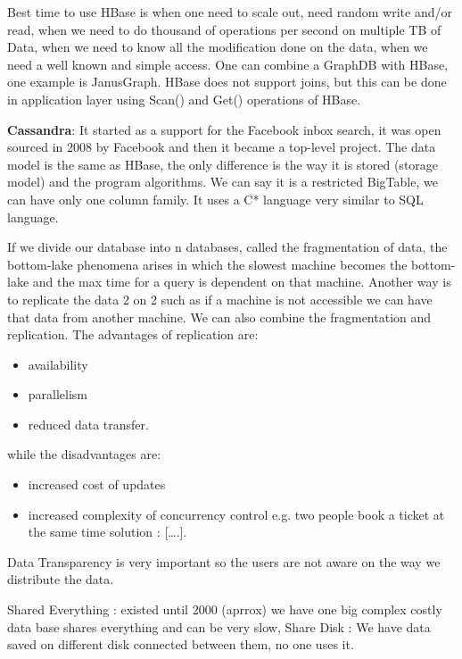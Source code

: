 \documentclass[a4page, 11pt]{article}
\begin{document}
Best time to use HBase is when one need to scale out, need random write and/or read, when we need to do thousand of operations per second on multiple TB of Data, when we need to know all the modification done on
the data, when we need a well known and simple access. One can combine a GraphDB with HBase, one example is JanusGraph.
HBase does not support joins, but this can be done in application layer using Scan() and Get() operations of HBase.

\textbf{Cassandra}: It started as a support for the Facebook inbox search, it was open sourced in 2008 by Facebook and then it became a top-level project. The data model is the same as HBase, the only difference is the way it is stored (storage model) and the program algorithms. We can say it is a restricted BigTable, we can have only one column family. It uses a C* language very similar to SQL language.

If we divide our database into n databases, called the fragmentation of data, the bottom-lake phenomena arises in which the slowest machine becomes the bottom-lake and the max time for a query is dependent on that machine. 
Another way is to replicate the data 2 on 2 such as if a machine is not accessible we can have that data from another machine. We can also combine the fragmentation and replication.
The advantages of replication are:
\begin{itemize}[noitemsep]
	\item
	availability
	\item
	parallelism
	\item
	reduced data transfer.
\end{itemize}

while the disadvantages are:

\begin{itemize}[noitemsep]
	 
	\item
	increased cost of updates
	\item
	increased complexity of concurrency control e.g. two people book a ticket at the same time solution : {[}\ldots{}.{]}.
\end{itemize}

Data Transparency is very important so the users are not aware on the way we distribute the data.

Shared Everything : existed until 2000 (aprrox) we have one big complex costly data base shares everything and can be very slow, Share Disk : We have data saved on different disk connected between them,
no one uses it.
\end{document}
